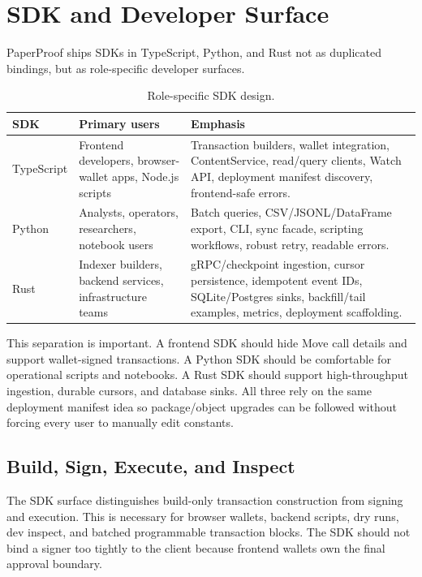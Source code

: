 \documentclass[journal]{IEEEtran}
\begin{document}
\section{SDK and Developer Surface}

PaperProof ships SDKs in TypeScript, Python, and Rust not as duplicated bindings, but as role-specific developer surfaces.

\begin{table}[!t]
\centering
\caption{Role-specific SDK design.}
\label{tab:sdk_roles}
\begin{tabularx}{\textwidth}{>{\raggedright\arraybackslash}p{2.7cm}>{\raggedright\arraybackslash}p{4.1cm}>{\raggedright\arraybackslash}X}
\toprule
SDK & Primary users & Emphasis \\
\midrule
TypeScript & Frontend developers, browser-wallet apps, Node.js scripts & Transaction builders, wallet integration, ContentService, read/query clients, Watch API, deployment manifest discovery, frontend-safe errors. \\
Python & Analysts, operators, researchers, notebook users & Batch queries, CSV/JSONL/DataFrame export, CLI, sync facade, scripting workflows, robust retry, readable errors. \\
Rust & Indexer builders, backend services, infrastructure teams & gRPC/checkpoint ingestion, cursor persistence, idempotent event IDs, SQLite/Postgres sinks, backfill/tail examples, metrics, deployment scaffolding. \\
\bottomrule
\end{tabularx}
\end{table}

This separation is important. A frontend SDK should hide Move call details and support wallet-signed transactions. A Python SDK should be comfortable for operational scripts and notebooks. A Rust SDK should support high-throughput ingestion, durable cursors, and database sinks. All three rely on the same deployment manifest idea so package/object upgrades can be followed without forcing every user to manually edit constants.

\subsection{Build, Sign, Execute, and Inspect}

The SDK surface distinguishes build-only transaction construction from signing and execution. This is necessary for browser wallets, backend scripts, dry runs, dev inspect, and batched programmable transaction blocks. The SDK should not bind a signer too tightly to the client because frontend wallets own the final approval boundary.
\end{document}
